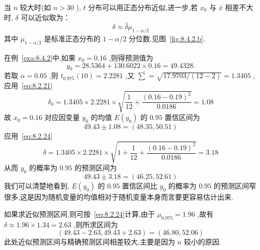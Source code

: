 当 $n$ 较大时(如 $n>30$ ), $t$ 分布可以用正态分布近似,进一步,若 $x_0$ 与 $\bar{x}$ 相差不大时, $\delta$ 可以近似取为：
\begin{equation}
\delta\approx \hat{\delta}\mu_{1-\alpha/2}  \label{eq:8.2.24}
\end{equation}
其中 $\mu_{1-\alpha/2}$ 是标准正态分布的 $1-\alpha/2$ 分位数,见图~\ref{fig:8.4.2.b}.

\begin{example}{}{}
    在例~\ref{exa:8.4.2}中,如果 $x_0=0.16$ ,则得预测值为
    \begin{equation}
    y_0=28.5364+130.6022×0.16=49.4328.
    \end{equation}
    若取 $\alpha=0.05$ ,则 $t_{0.975}(10)=2.2281$ ,又 $\hat{\sum}=\sqrt{17.9703/(12-2)}=1.3405$ ,应用~\ref{eq:8.2.21}
    \begin{equation}
    \delta_{0}=1.3405 \times 2.2281 \times \sqrt{\frac{1}{12}+\frac{(0.16-0.19)^{2}}{0.0186}}=1.08
    \end{equation}
    故 $x_0=0.16$ 对应因变量 $y_0$ 的均值 $E(y_0)$ 的 $0.95$ 置信区间为
    \begin{equation}
    49.43\pm 1.08=\left( 48.35,50.51 \right) 
    \end{equation}
    应用~\ref{eq:8.2.24}
    \begin{equation}
    \delta=1.3405 \times 2.2281 \times \sqrt{1+\frac{1}{12}+\frac{(0.16-0.19)^{2}}{0.0186}}=3.18
    \end{equation}
    从而 $y_0$ 的概率为 $0.95$ 的预测区间为
    \begin{equation}
    49.43\pm 3.18=(46.25,52.61)
    \end{equation}
    我们可以清楚地看到, $E(y_0)$ 的 $0.95$ 置信区间比 $y_0$ 的概率为 $0.95$ 的预测区间窄很多,这是因为随机变量的均值相对于随机变量本身而言要更容易估计出来.
    
    如果求近似预测区间,则可按~\ref{eq:8.2.24}计算,由于 $\mu_{0.975}=1.96$ ,故有
 $\delta\approx 1.96\times 1.34=2.63$ ,则所求区间为
    \begin{equation}
    (49.43-2.63,49.43+2.63)=(46.80,52.06)
    \end{equation}
    此处近似预测区间与精确预测区间相差较大,主要是因为 $n$ 较小的原因.
\end{example}

